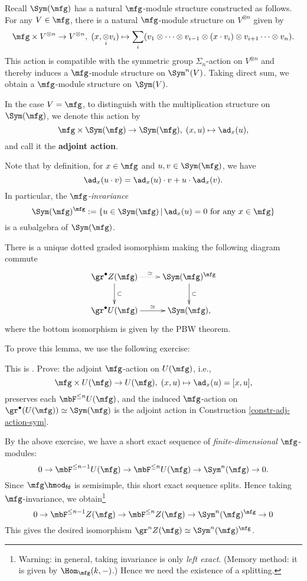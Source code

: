 	\begin{constr}
	\label{constr-adj-action-sym}
		Recall $\Sym(\mfg)$ has a natural $\mfg$-module structure constructed as follows. For any $V\in \mfg$, there is a natural $\mfg$-module structure on $V^{\otimes n}$ given by 
		\[
			\mfg \mt V^{\otimes n} \to V^{\otimes n},\; (x, \ot_i v_i)\mapsto \sum_i ( v_1\ot \cdots\ot v_{i-1}\ot (x\cdot v_i) \ot v_{i+1}\cdots \ot v_n ).
		\]
		This action is compatible with the symmetric group $\Sigma_n$-action on $V^{\otimes n}$ and thereby induces a $\mfg$-module structure on $\Sym^n(V)$. Taking direct sum, we obtain a $\mfg$-module structure on $\Sym(V)$. 

		In the case $V=\mfg$, to distinguish with the multiplication structure on $\Sym(\mfg)$, we denote this action by
		\[
			\mfg \times \Sym(\mfg) \to \Sym(\mfg) ,\; (x,u)\mapsto \ad_x(u),
		\]
		and call it the \textbf{adjoint action}.

		Note that by definition, for $x\in \mfg$ and $u,v\in \Sym(\mfg)$, we have
		\[
			\ad_x(u\cdot v) = \ad_x(u)\cdot v + u\cdot \ad_x(v).
		\]
		In particular, the \emph{$\mfg$-invariance} 
		\[
			\Sym(\mfg)^\mfg:= \{ u\in \Sym(\mfg)\,\vert\, \ad_x(u)=0\textrm{ for any }x\in \mfg \}
		\]
		is a subalgebra of $\Sym(\mfg)$.
	\end{constr}

	\begin{lem}
	\label{lem-Zg-fil}
		There is a unique dotted graded isomorphism making the following diagram commute
		\[
			\xymatrix{
				\gr^\bullet Z(\mfg) \ar@{.>}[r]^-\simeq \ar[d]^-\subset
				& \Sym(\mfg)^\mfg \ar[d]^-\subset \\
				\gr^\bullet U(\mfg) \ar[r]^-\simeq 
				& \Sym(\mfg),
			}
		\]
		where the bottom isomorphism is given by the PBW theorem.
	\end{lem}

	To prove this lemma, we use the following exercise:

	\begin{exe}
		This is . Prove: the adjoint $\mfg$-action on $U(\mfg)$, i.e.,
		\[
			\mfg \times U(\mfg) \to U(\mfg),\; (x,u)\mapsto \ad_x(u)=[x,u],
		\]
		preserves each $\mbF^{\le n}U(\mfg)$, and the induced $\mfg$-action on $\gr^\bullet(U(\mfg)) \simeq \Sym(\mfg)$ is the adjoint action in Construction \ref{constr-adj-action-sym}.
	\end{exe}


		By the above exercise, we have a short exact sequence of \emph{finite-dimensional} $\mfg$-modules:
		\[
			0 \to \mbF^{\le n-1} U(\mfg) \to \mbF^{\le n} U(\mfg)  \to \Sym^n(\mfg) \to 0.
		\]
		Since $\mfg\hmod_\mathsf{fd}$ is semisimple, this short exact sequence splits. Hence taking $\mfg$-invariance, we obtain\footnote{
			Warning: in general, taking invariance is only \emph{left exact}. (Memory method: it is given by $\Hom_{\mfg}(k,-)$.) Hence we need the existence of a splitting.
		}
		\[
			0 \to \mbF^{\le n-1} Z(\mfg) \to \mbF^{\le n} Z(\mfg) \to \Sym^n(\mfg)^\mfg \to 0
		\]
		This gives the desired isomorphism $\gr^n Z(\mfg) \simeq \Sym^n(\mfg)^\mfg$.

